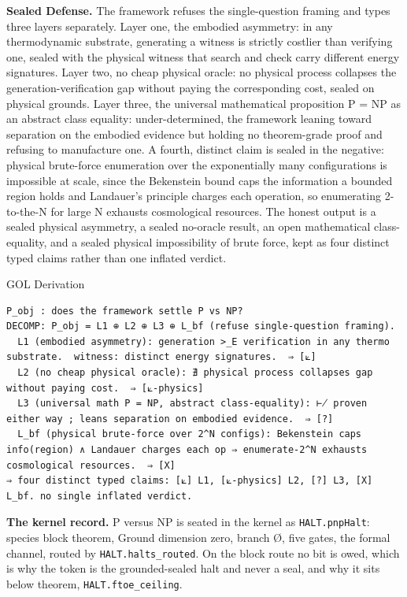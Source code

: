 \documentclass[10pt,twocolumn]{article}
\begin{document}
\textbf{Sealed Defense.} The framework refuses the single-question
framing and types three layers separately. Layer one, the embodied
asymmetry: in any thermodynamic substrate, generating a witness is
strictly costlier than verifying one, sealed with the physical witness
that search and check carry different energy signatures. Layer two, no
cheap physical oracle: no physical process collapses the
generation-verification gap without paying the corresponding cost,
sealed on physical grounds. Layer three, the universal mathematical
proposition P = NP as an abstract class equality: under-determined, the
framework leaning toward separation on the embodied evidence but holding
no theorem-grade proof and refusing to manufacture one. A fourth,
distinct claim is sealed in the negative: physical brute-force
enumeration over the exponentially many configurations is impossible at
scale, since the Bekenstein bound caps the information a bounded region
holds and Landauer's principle charges each operation, so enumerating
2-to-the-N for large N exhausts cosmological resources. The honest
output is a sealed physical asymmetry, a sealed no-oracle result, an
open mathematical class-equality, and a sealed physical impossibility of
brute force, kept as four distinct typed claims rather than one inflated
verdict.

\begin{golbox}{GOL Derivation}
\begin{lstlisting}[style=golv]
P_obj : does the framework settle P vs NP?
DECOMP: P_obj = L1 ⊕ L2 ⊕ L3 ⊕ L_bf (refuse single-question framing).
  L1 (embodied asymmetry): generation >_E verification in any thermo substrate.  witness: distinct energy signatures.  ⇒ [⟀]
  L2 (no cheap physical oracle): ∄ physical process collapses gap without paying cost.  ⇒ [⟀-physics]
  L3 (universal math P = NP, abstract class-equality): ⊬ proven either way ; leans separation on embodied evidence.  ⇒ [?]
  L_bf (physical brute-force over 2^N configs): Bekenstein caps info(region) ∧ Landauer charges each op ⇒ enumerate-2^N exhausts cosmological resources.  ⇒ [X]
⇒ four distinct typed claims: [⟀] L1, [⟀-physics] L2, [?] L3, [X] L_bf. no single inflated verdict.
\end{lstlisting}
\end{golbox}

\textbf{The kernel record.} P versus NP is seated in the kernel as
\texttt{HALT.pnpHalt}: species block theorem, Ground dimension zero,
branch Ø, five gates, the formal channel, routed by
\texttt{HALT.halts\_routed}. On the block route no bit is owed, which is
why the token is the grounded-sealed halt and never a seal, and why it
sits below theorem, \texttt{HALT.ftoe\_ceiling}.
\end{document}
